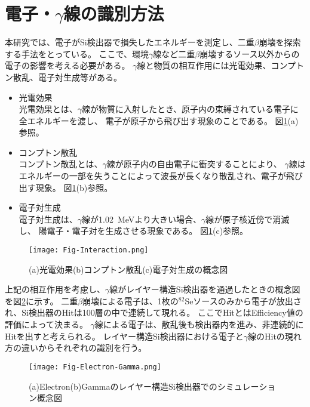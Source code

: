 \documentclass[a4paper,10pt]{jreport}
\begin{document}
\section{電子・$\gamma$線の識別方法}

本研究では、電子がSi検出器で損失したエネルギーを測定し、二重$\beta$崩壊を探索する手法をとっている。
ここで、環境$\gamma$線など二重$\beta$崩壊するソース以外からの電子の影響を考える必要がある。
$\gamma$線と物質の相互作用には光電効果、コンプトン散乱、電子対生成等がある。

\begin{itemize}
	\item 光電効果 \\
	光電効果とは、$\gamma$線が物質に入射したとき、原子内の束縛されている電子に全エネルギーを渡し、
	電子が原子から飛び出す現象のことである。
	図\ref{Fig-Interaction}(a)参照。
	
	\item コンプトン散乱 \\
	コンプトン散乱とは、$\gamma$線が原子内の自由電子に衝突することにより、
	$\gamma$線はエネルギーの一部を失うことによって波長が長くなり散乱され、電子が飛び出す現象。
	図\ref{Fig-Interaction}(b)参照。
	
	\item 電子対生成 \\
	電子対生成は、$\gamma$線が\SI{1.02}{MeV}より大きい場合、$\gamma$線が原子核近傍で消滅し、
	陽電子・電子対を生成させる現象である。
	図\ref{Fig-Interaction}(c)参照。
\end{itemize}

\begin{figure}[H]
	\center
	\texttt{[image: Fig-Interaction.png]}
	\caption{(a)光電効果(b)コンプトン散乱(c)電子対生成の概念図} \label{Fig-Interaction}
\end{figure}

上記の相互作用を考慮し、$\gamma$線がレイヤー構造Si検出器を通過したときの概念図を図\ref{Fig-Electron-Gamma}に示す。
二重$\beta$崩壊による電子は、1枚の$^{82}$Seソースのみから電子が放出され、Si検出器のHitは100層の中で連続して現れる。
ここでHitとはEfficiency値の評価によって決まる。
$\gamma$線による電子は、散乱後も検出器内を進み、非連続的にHitを出すと考えられる。
レイヤー構造Si検出器における電子と$\gamma$線のHitの現れ方の違いからそれぞれの識別を行う。

\begin{figure}[H]
	\center
	\texttt{[image: Fig-Electron-Gamma.png]}
	\caption{(a)Electron(b)Gammaのレイヤー構造Si検出器でのシミュレーション概念図} \label{Fig-Electron-Gamma}
\end{figure}
\end{document}
